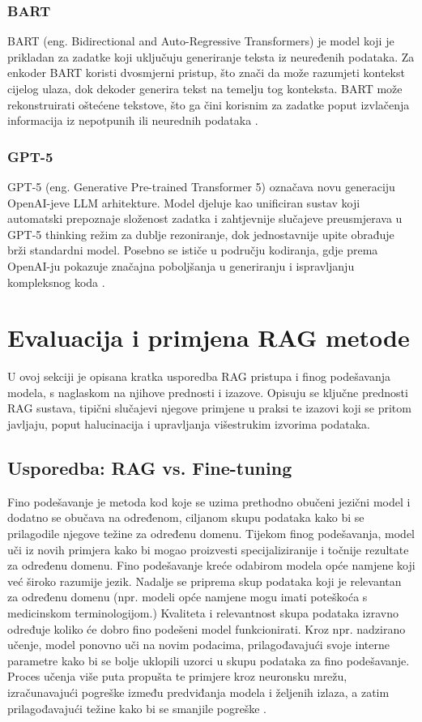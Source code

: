 \documentclass[]{foi}
\begin{document}
\subsubsection{BART}
BART (eng. Bidirectional and Auto-Regressive Transformers) je model koji je prikladan za zadatke koji uključuju generiranje teksta 
iz neuređenih podataka. Za enkoder BART koristi dvosmjerni pristup, što znači da može razumjeti kontekst cijelog ulaza,
dok dekoder generira tekst na temelju tog konteksta. BART može rekonstruirati oštećene tekstove, što ga čini korisnim za zadatke poput
izvlačenja informacija iz nepotpunih ili neurednih podataka \cite{gupta2024rag}. 

\subsubsection{GPT-5}
GPT-5 (eng. Generative Pre-trained Transformer 5) označava novu generaciju OpenAI-jeve LLM arhitekture. Model djeluje kao unificiran sustav koji automatski prepoznaje 
složenost zadatka i zahtjevnije slučajeve preusmjerava u GPT-5 thinking režim za dublje rezoniranje, dok jednostavnije upite obrađuje brži standardni model. 
Posebno se ističe u području kodiranja, gdje prema OpenAI-ju pokazuje značajna poboljšanja u generiranju i ispravljanju kompleksnog koda \cite{openaiGPT5}. 

\newpage
\section{Evaluacija i primjena RAG metode}
U ovoj sekciji je opisana kratka usporedba RAG pristupa i finog podešavanja modela, s naglaskom na njihove prednosti i izazove. Opisuju se
ključne prednosti RAG sustava, tipični slučajevi njegove primjene u praksi te izazovi koji se pritom javljaju, poput halucinacija i upravljanja
višestrukim izvorima podataka.

\subsection{Usporedba: RAG vs. Fine-tuning}
Fino podešavanje je metoda kod koje se uzima prethodno obučeni jezični model i dodatno se obučava na određenom, ciljanom skupu podataka kako bi se prilagodile njegove težine za određenu domenu. Tijekom finog podešavanja, model uči iz novih primjera kako bi mogao proizvesti specijaliziranije i točnije rezultate za određenu domenu.
Fino podešavanje kreće odabirom modela opće namjene koji već široko razumije jezik. Nadalje se priprema skup podataka koji je relevantan za određenu domenu (npr. modeli opće namjene mogu imati poteškoća s medicinskom terminologijom.)
Kvaliteta i relevantnost skupa podataka izravno određuje koliko će dobro fino podešeni model funkcionirati. Kroz npr. nadzirano učenje, model ponovno uči na novim podacima, prilagođavajući 
svoje interne parametre kako bi se bolje uklopili uzorci u skupu podataka za fino podešavanje. Proces učenja više puta propušta te primjere kroz neuronsku mrežu,
izračunavajući pogreške između predviđanja modela i željenih izlaza, a zatim prilagođavajući težine kako bi se smanjile pogreške \cite{montecarlo2023rag}.
\end{document}
